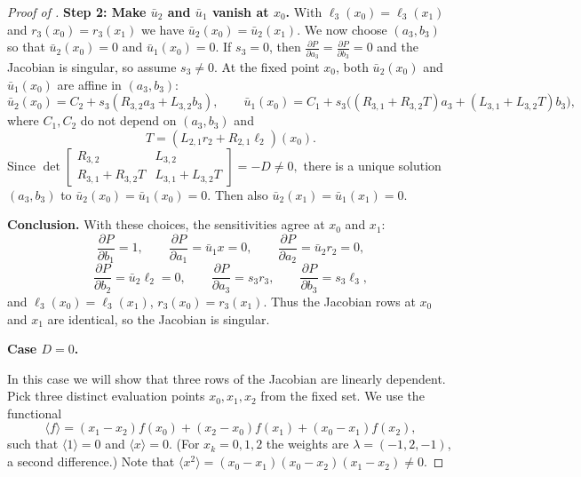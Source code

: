 \begin{proof}[Proof of ]
\smallskip
\noindent\textbf{Step 2: Make $\bar u_2$ and $\bar u_1$ vanish at $x_0$.}
With $\ell_3(x_0)=\ell_3(x_1)$ and $r_3(x_0)=r_3(x_1)$ we have $\bar u_2(x_0)=\bar u_2(x_1)$.
We now choose $(a_3,b_3)$ so that $\bar u_2(x_0)=0$ and $\bar u_1(x_0)=0$.
If $s_3=0$, then $\frac{\partial P}{\partial a_3}=\frac{\partial P}{\partial b_3}=0$ and the Jacobian is singular, so assume $s_3\neq 0$.
At the fixed point $x_0$, both $\bar u_2(x_0)$ and $\bar u_1(x_0)$ are affine in $(a_3,b_3)$:
\[
	   \bar u_2(x_0) = C_2 + s_3(R_{3,2} a_3 + L_{3,2} b_3),\qquad
	   \bar u_1(x_0) = C_1 + s_3\bigl((R_{3,1}+R_{3,2}T)a_3 + (L_{3,1}+L_{3,2}T)b_3\bigr),
\]
where $C_1,C_2$ do not depend on $(a_3,b_3)$ and
\[
   T = (L_{2,1} r_2 + R_{2,1} \ell_2)(x_0).
\]
Since
\(
\det\!\begin{bmatrix}
	   R_{3,2} & L_{3,2} \\
	   R_{3,1}+R_{3,2}T & L_{3,1}+L_{3,2}T
\end{bmatrix}
= -D\neq 0,
\)
there is a unique solution $(a_3,b_3)$ to $\bar u_2(x_0)=\bar u_1(x_0)=0$.
Then also $\bar u_2(x_1)=\bar u_1(x_1)=0$.

\smallskip
\noindent\textbf{Conclusion.}
With these choices, the sensitivities agree at $x_0$ and $x_1$:
\[
   \frac{\partial P}{\partial b_1}=1,\qquad
   \frac{\partial P}{\partial a_1}=\bar u_1 x=0,\qquad
   \frac{\partial P}{\partial a_2}=\bar u_2 r_2=0,
\]
\[
   \frac{\partial P}{\partial b_2}=\bar u_2 \ell_2=0,\qquad
   \frac{\partial P}{\partial a_3}=s_3 r_3,\qquad
   \frac{\partial P}{\partial b_3}=s_3 \ell_3,
\]
and $\ell_3(x_0)=\ell_3(x_1)$, $r_3(x_0)=r_3(x_1)$.
Thus the Jacobian rows at $x_0$ and $x_1$ are identical, so the Jacobian is singular.

\medskip
\noindent\textbf{Case $D=0$.}

In this case we will show that three rows of the Jacobian are linearly dependent.
Pick three distinct evaluation points $x_0,x_1,x_2$ from the fixed set.
We use the functional
\[
   \langle f \rangle = (x_1 - x_2) f(x_0) + (x_2 - x_0) f(x_1) + (x_0 - x_1) f(x_2),
\]
such that $\langle 1 \rangle = 0$ and $\langle x \rangle = 0$.
(For $x_k=0,1,2$ the weights are $\lambda=(-1,2,-1)$, a second difference.)
Note that $\langle x^2\rangle = (x_0 - x_1)(x_0 - x_2)(x_1 - x_2) \neq 0$.


\end{proof}
